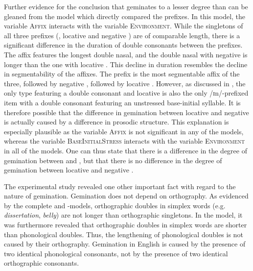 Further evidence for the conclusion that  geminates to a lesser degree than  can be gleaned from the model which directly compared the prefixes. In this model, the variable \textsc{Affix} interacts with the variable \textsc{Environment}. 
While the singletons of all three prefixes (, locative  and negative ) are of comparable length, there is a significant difference in the duration of double consonants between the prefixes. The affix  features the longest double nasal,  and the double nasal with negative  is longer than the one with locative . This decline in duration resembles the decline in segmentability of the affixes. The prefix  is the most segmentable affix of the three, followed by negative , followed by locative . However, as discussed in , the only type featuring a double consonant and locative  is also the only /ɪn/-prefixed item with a double consonant featuring an unstressed base-initial syllable. It is therefore possible that the difference in gemination between locative and negative  is actually caused by a difference in prosodic structure. This explanation is especially plausible as the variable \textsc{Affix} is not significant in any of the models, whereas the variable \textsc{BaseInitialStress} interacts with the variable \textsc{Environment} in all of the models. 
One can thus state that there is a difference in the degree of gemination between  and , but that there is no difference in the degree of gemination between locative and negative .


The experimental study revealed one other important fact with regard to the nature of gemination. Gemination does not depend on orthography. As evidenced by the complete  and -models, orthographic doubles in simplex words (e.g. \textit{dissertation}, \textit{belly}) are not longer than orthographic singletons. 
In the model, it was furthermore revealed that orthographic doubles in simplex words are shorter than phonological doubles. 
Thus, the lengthening of phonological doubles is not caused by their orthography. %
Gemination in English is caused by the presence of two identical phonological consonants, not by the presence of two identical orthographic consonants.


